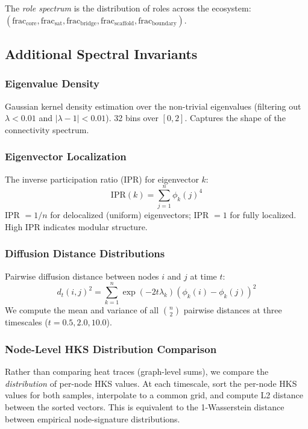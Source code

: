 \documentclass{../yalumba}
\begin{document}
The \emph{role spectrum} is the distribution of roles across the ecosystem:
$(\text{frac}_{\text{core}}, \text{frac}_{\text{sat}}, \text{frac}_{\text{bridge}},
\text{frac}_{\text{scaffold}}, \text{frac}_{\text{boundary}})$.

\subsection{Additional Spectral Invariants}

\subsubsection{Eigenvalue Density}

Gaussian kernel density estimation over the non-trivial eigenvalues
(filtering out $\lambda < 0.01$ and $|\lambda - 1| < 0.01$).  32 bins over
$[0, 2]$.  Captures the shape of the connectivity spectrum.

\subsubsection{Eigenvector Localization}

The inverse participation ratio (IPR) for eigenvector $k$:
\begin{equation}
  \text{IPR}(k) = \sum_{j=1}^{n} \phi_k(j)^4
\end{equation}
IPR $= 1/n$ for delocalized (uniform) eigenvectors; IPR $= 1$ for fully
localized.  High IPR indicates modular structure.

\subsubsection{Diffusion Distance Distributions}

Pairwise diffusion distance between nodes $i$ and $j$ at time $t$:
\begin{equation}
  d_t(i,j)^2 = \sum_{k=1}^{n} \exp(-2t\lambda_k)(\phi_k(i) - \phi_k(j))^2
\end{equation}
We compute the mean and variance of all $\binom{n}{2}$ pairwise distances at
three timescales ($t = 0.5, 2.0, 10.0$).

\subsubsection{Node-Level HKS Distribution Comparison}

Rather than comparing heat traces (graph-level sums), we compare the
\emph{distribution} of per-node HKS values.  At each timescale, sort the
per-node HKS values for both samples, interpolate to a common grid, and compute
L2 distance between the sorted vectors.  This is equivalent to the 1-Wasserstein
distance between empirical node-signature distributions.
\end{document}
